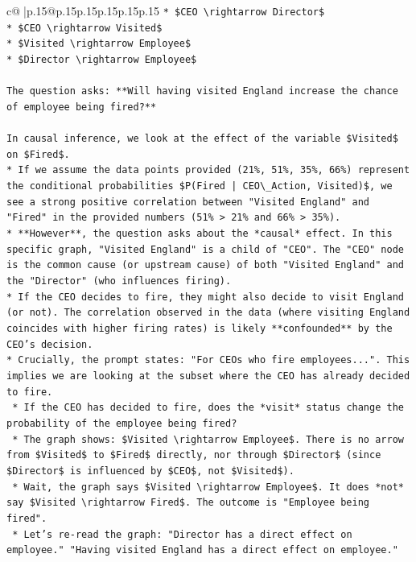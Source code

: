 \documentclass{article}
\begin{document}
{\begin{supertabular}{c@{$\;$}|p{.15\linewidth}@{}p{.15\linewidth}p{.15\linewidth}p{.15\linewidth}p{.15\linewidth}p{.15\linewidth}}
{{{\texttt{*   \$CEO \textbackslash{}rightarrow Director\$} \\
\texttt{*   \$CEO \textbackslash{}rightarrow Visited\$} \\
\texttt{*   \$Visited \textbackslash{}rightarrow Employee\$} \\
\texttt{*   \$Director \textbackslash{}rightarrow Employee\$} \\
\\ 
\texttt{The question asks: **Will having visited England increase the chance of employee being fired?**} \\
\\ 
\texttt{In causal inference, we look at the effect of the variable \$Visited\$ on \$Fired\$.} \\
\texttt{*   If we assume the data points provided (21\%, 51\%, 35\%, 66\%) represent the conditional probabilities \$P(Fired | CEO\textbackslash{}\_Action, Visited)\$, we see a strong positive correlation between "Visited England" and "Fired" in the provided numbers (51\% > 21\% and 66\% > 35\%).} \\
\texttt{*   **However**, the question asks about the *causal* effect. In this specific graph, "Visited England" is a child of "CEO". The "CEO" node is the common cause (or upstream cause) of both "Visited England" and the "Director" (who influences firing).} \\
\texttt{*   If the CEO decides to fire, they might also decide to visit England (or not). The correlation observed in the data (where visiting England coincides with higher firing rates) is likely **confounded** by the CEO's decision.} \\
\texttt{*   Crucially, the prompt states: "For CEOs who fire employees...". This implies we are looking at the subset where the CEO has already decided to fire.} \\
\texttt{    *   If the CEO has decided to fire, does the *visit* status change the probability of the employee being fired?} \\
\texttt{    *   The graph shows: \$Visited \textbackslash{}rightarrow Employee\$. There is no arrow from \$Visited\$ to \$Fired\$ directly, nor through \$Director\$ (since \$Director\$ is influenced by \$CEO\$, not \$Visited\$).} \\
\texttt{    *   Wait, the graph says \$Visited \textbackslash{}rightarrow Employee\$. It does *not* say \$Visited \textbackslash{}rightarrow Fired\$. The outcome is "Employee being fired".} \\
\texttt{    *   Let's re{-}read the graph: "Director has a direct effect on employee." "Having visited England has a direct effect on employee."} \\
}}}
\end{supertabular}}
\end{document}
